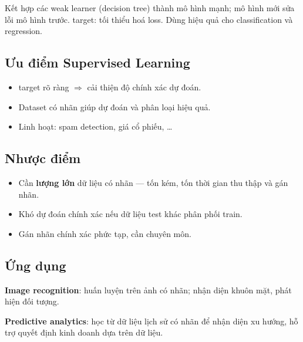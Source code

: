 \begin{ynghia}[title={Gradient Boosting}]
Kết hợp các weak learner (decision tree) thành mô hình mạnh; mô hình mới sửa lỗi mô hình trước.
target: tối thiểu hoá loss.
Dùng hiệu quả cho classification và regression.
\end{ynghia}

\subsection{Ưu điểm Supervised Learning}

\begin{tinhchat}[title={Ưu điểm}]
\begin{itemize}
  \item target rõ ràng $\Rightarrow$ cải thiện độ chính xác dự đoán.
  \item Dataset có nhãn giúp dự đoán và phân loại hiệu quả.
  \item Linh hoạt: spam detection, giá cổ phiếu, \ldots
\end{itemize}
\end{tinhchat}

\subsection{Nhược điểm}

\begin{luuy}[title={Nhược điểm}]
\begin{itemize}
  \item Cần \textbf{lượng lớn} dữ liệu có nhãn --- tốn kém, tốn thời gian thu thập và gán nhãn.
  \item Khó dự đoán chính xác nếu dữ liệu test khác phân phối train.
  \item Gán nhãn chính xác phức tạp, cần chuyên môn.
\end{itemize}
\end{luuy}

\subsection{Ứng dụng}

\begin{phuongphap}[title={Lĩnh vực ứng dụng}]
\textbf{Image recognition}: huấn luyện trên ảnh có nhãn; nhận diện khuôn mặt, phát hiện đối tượng.

\textbf{Predictive analytics}: học từ dữ liệu lịch sử có nhãn để nhận diện xu hướng, hỗ trợ quyết định kinh doanh dựa trên dữ liệu.
\end{phuongphap}
